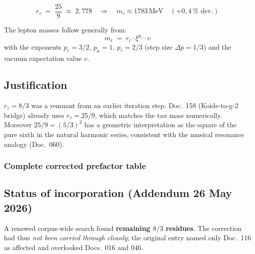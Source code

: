 \begin{equation}
  \boxed{r_\tau \;=\; \frac{25}{9} \;\approx\; 2{,}778}
  \quad \Rightarrow \quad
  m_\tau \approx 1783\,\text{MeV} \quad (+0{,}4\,\% \text{ dev.})
  \tag{190.2}
\end{equation}

The lepton masses follow generally from:
\begin{equation}
  m_\ell \;=\; r_\ell \cdot \xi^{p_\ell} \cdot v
  \tag{190.3}
\end{equation}
with the exponents $p_e = 3/2$, $p_\mu = 1$, $p_\tau = 2/3$
(step size $\Delta p = 1/3$) and the vacuum expectation value $v$.

\subsection*{Justification}

$r_\tau = 8/3$ was a remnant from an earlier iteration step. Doc.~158
(Koide-to-g-2 bridge) already uses $r_\tau = 25/9$, which matches the tau mass
numerically. Moreover $25/9 = (5/3)^2$ has a geometric interpretation as the
square of the pure sixth in the natural harmonic series, consistent with the
musical resonance analogy (Doc.~060).

\subsubsection*{Complete corrected prefactor table}

\begin{center}
{\footnotesize
{}
} %
\end{center}

\subsection*{Status of incorporation (Addendum 26 May 2026)}

A renewed corpus-wide search found \textbf{remaining $8/3$ residues}. The
correction had thus \emph{not been carried through cleanly}; the original entry
named only Doc.~116 as affected and overlooked Docs.~016 and 046.

